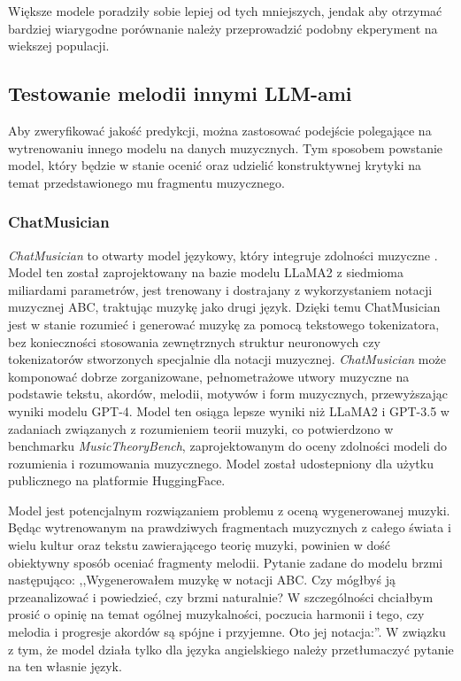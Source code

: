 \documentclass[data-science]{agh-wi} %
\begin{document}
Większe modele poradziły sobie lepiej od tych mniejszych, jendak aby otrzymać bardziej wiarygodne porównanie należy przeprowadzić podobny ekperyment na wiekszej populacji.

\subsection{Testowanie melodii innymi LLM-ami}
Aby zweryfikować jakość predykcji, można zastosować podejście polegające na wytrenowaniu innego modelu na danych muzycznych. Tym sposobem powstanie model, który będzie w stanie ocenić oraz udzielić konstruktywnej krytyki na temat przedstawionego mu fragmentu muzycznego.
\subsubsection*{ChatMusician}
\textit{ChatMusician} to otwarty model językowy, który integruje zdolności muzyczne \cite{yuan2024chatmusician}. Model ten został zaprojektowany na bazie modelu LLaMA2 z siedmioma miliardami parametrów, jest trenowany i dostrajany z wykorzystaniem notacji muzycznej ABC, traktując muzykę jako drugi język. Dzięki temu ChatMusician jest w stanie rozumieć i generować muzykę za pomocą tekstowego tokenizatora, bez konieczności stosowania zewnętrznych struktur neuronowych czy tokenizatorów stworzonych specjalnie dla notacji muzycznej. \textit{ChatMusician} może komponować dobrze zorganizowane, pełnometrażowe utwory muzyczne na podstawie tekstu, akordów, melodii, motywów i form muzycznych, przewyższając wyniki modelu GPT-4. Model ten osiąga lepsze wyniki niż LLaMA2 i GPT-3.5 w zadaniach związanych z rozumieniem teorii muzyki, co potwierdzono w benchmarku \textit{MusicTheoryBench}, zaprojektowanym do oceny zdolności modeli do rozumienia i rozumowania muzycznego. Model został udostepniony dla użytku publicznego na platformie HuggingFace.

Model jest potencjalnym rozwiązaniem problemu z oceną wygenerowanej muzyki. Będąc wytrenowanym na prawdziwych fragmentach muzycznych z całego świata i wielu kultur oraz tekstu zawierającego teorię muzyki, powinien w dość obiektywny sposób oceniać fragmenty melodii. Pytanie zadane do modelu brzmi następująco: ,,Wygenerowałem muzykę w notacji ABC. Czy mógłbyś ją przeanalizować i powiedzieć, czy brzmi naturalnie? W szczególności chciałbym prosić o opinię na temat ogólnej muzykalności, poczucia harmonii i tego, czy melodia i progresje akordów są spójne i przyjemne. Oto jej notacja:''. W związku z tym, że model działa tylko dla języka angielskiego należy przetłumaczyć pytanie na ten własnie język.
\end{document}
